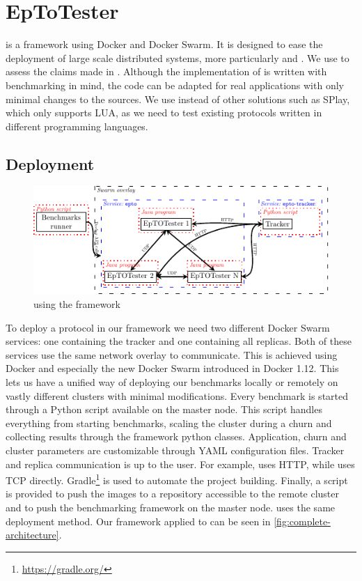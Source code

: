 \section{EpToTester}
\label{sec:epto}
\eptotester is a framework using Docker and Docker Swarm. It is designed to ease the deployment of large scale distributed systems, more particularly \jgroups and \epto. We use \eptotester to assess the claims made in \autocite{matos2015epto}. Although the implementation of \epto is written with benchmarking in mind, the code can be adapted for real applications with only minimal changes to the sources. We  use \eptotester instead of other solutions such as SPlay, which only supports LUA, as we need to test existing protocols written in different programming languages.
\subsection{Deployment}
\begin{figure}[htp]
	\centering
	\includegraphics[width=\linewidth]{figures/complete-architecture.pdf}
	\vspace{-2mm} 
	\caption[Caption]{\epto using the \eptotester framework\footnotemark}
	\vspace{-2mm} 
	\label{fig:complete-architecture}
\end{figure}
To deploy a protocol in our framework we need two different Docker Swarm services: one containing the tracker and one containing all replicas. Both of these services use the same network overlay to communicate. This is achieved using Docker and especially the new Docker Swarm introduced in Docker 1.12. This lets us have a unified way of deploying our benchmarks locally or remotely on vastly different clusters with minimal modifications. Every benchmark is started through a Python script available on the master node. This script handles everything from starting benchmarks, scaling the cluster during a churn and collecting results through the framework python classes. Application, churn and cluster  parameters are customizable through YAML configuration files. Tracker and replica communication is up to the user. For example, \epto uses HTTP, while \jgroups uses TCP directly.
Gradle\footnote{\href{https://gradle.org/}{https://gradle.org/}} is used to automate the project building. Finally, a script is provided to push the images to a repository accessible to the remote cluster and to push the benchmarking framework on the master node. \jgroups uses the same deployment method. Our framework applied to \epto can be seen in \autoref{fig:complete-architecture}.
